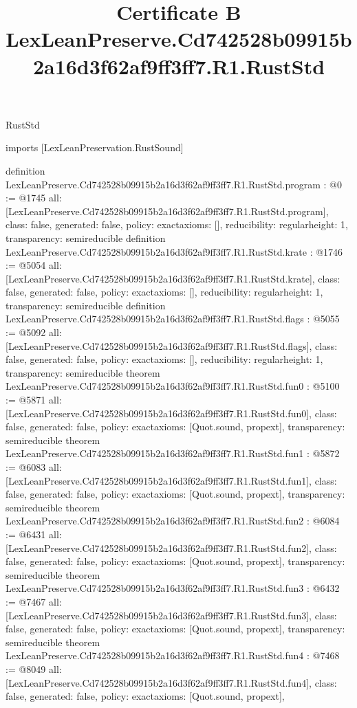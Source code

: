\begin{lexlean}{RustStd}
\title{Certificate B LexLeanPreserve.Cd742528b09915b2a16d3f62af9ff3ff7.R1.RustStd}
\begin{coremodule}
imports [LexLeanPreservation.RustSound]

definition LexLeanPreserve.Cd742528b09915b2a16d3f62af9ff3ff7.R1.RustStd.program : @0 := @1745 {
  all: [LexLeanPreserve.Cd742528b09915b2a16d3f62af9ff3ff7.R1.RustStd.program],
  class: false,
  generated: false,
  policy: exact{axioms: []},
  reducibility: regular{height: 1},
  transparency: semireducible
}
definition LexLeanPreserve.Cd742528b09915b2a16d3f62af9ff3ff7.R1.RustStd.krate : @1746 := @5054 {
  all: [LexLeanPreserve.Cd742528b09915b2a16d3f62af9ff3ff7.R1.RustStd.krate],
  class: false,
  generated: false,
  policy: exact{axioms: []},
  reducibility: regular{height: 1},
  transparency: semireducible
}
definition LexLeanPreserve.Cd742528b09915b2a16d3f62af9ff3ff7.R1.RustStd.flags : @5055 := @5092 {
  all: [LexLeanPreserve.Cd742528b09915b2a16d3f62af9ff3ff7.R1.RustStd.flags],
  class: false,
  generated: false,
  policy: exact{axioms: []},
  reducibility: regular{height: 1},
  transparency: semireducible
}
theorem LexLeanPreserve.Cd742528b09915b2a16d3f62af9ff3ff7.R1.RustStd.fun0 : @5100 := @5871 {
  all: [LexLeanPreserve.Cd742528b09915b2a16d3f62af9ff3ff7.R1.RustStd.fun0],
  class: false,
  generated: false,
  policy: exact{axioms: [Quot.sound, propext]},
  transparency: semireducible
}
theorem LexLeanPreserve.Cd742528b09915b2a16d3f62af9ff3ff7.R1.RustStd.fun1 : @5872 := @6083 {
  all: [LexLeanPreserve.Cd742528b09915b2a16d3f62af9ff3ff7.R1.RustStd.fun1],
  class: false,
  generated: false,
  policy: exact{axioms: [Quot.sound, propext]},
  transparency: semireducible
}
theorem LexLeanPreserve.Cd742528b09915b2a16d3f62af9ff3ff7.R1.RustStd.fun2 : @6084 := @6431 {
  all: [LexLeanPreserve.Cd742528b09915b2a16d3f62af9ff3ff7.R1.RustStd.fun2],
  class: false,
  generated: false,
  policy: exact{axioms: [Quot.sound, propext]},
  transparency: semireducible
}
theorem LexLeanPreserve.Cd742528b09915b2a16d3f62af9ff3ff7.R1.RustStd.fun3 : @6432 := @7467 {
  all: [LexLeanPreserve.Cd742528b09915b2a16d3f62af9ff3ff7.R1.RustStd.fun3],
  class: false,
  generated: false,
  policy: exact{axioms: [Quot.sound, propext]},
  transparency: semireducible
}
theorem LexLeanPreserve.Cd742528b09915b2a16d3f62af9ff3ff7.R1.RustStd.fun4 : @7468 := @8049 {
  all: [LexLeanPreserve.Cd742528b09915b2a16d3f62af9ff3ff7.R1.RustStd.fun4],
  class: false,
  generated: false,
  policy: exact{axioms: [Quot.sound, propext]},
}
\end{coremodule}
\end{lexlean}
